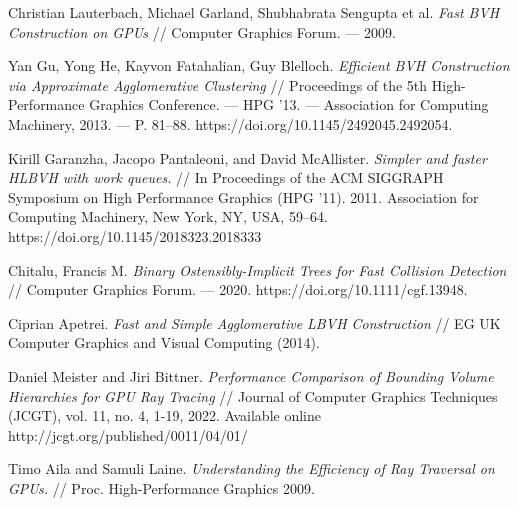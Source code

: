 \documentclass[11pt,fleqn,english,russian]{report} %
\begin{document}
\begin{thebibliography}{10}
	 Christian Lauterbach, Michael Garland, Shubhabrata Sengupta et al. \textit{Fast BVH Construction on GPUs} // Computer Graphics Forum. — 2009.
	
	 Yan Gu, Yong He, Kayvon Fatahalian, Guy Blelloch. \textit{Efficient BVH Construction via Approximate Agglomerative Clustering} // Proceedings of the 5th High-Performance Graphics Conference. — HPG ’13. — Association for Computing Machinery, 2013. — P. 81–88. https://doi.org/10.1145/2492045.2492054.
	
	 Kirill Garanzha, Jacopo Pantaleoni, and David McAllister. \textit{Simpler and faster HLBVH with work queues.} // In Proceedings of the ACM SIGGRAPH Symposium on High Performance Graphics (HPG '11). 2011. Association for Computing Machinery, New York, NY, USA, 59–64. https://doi.org/10.1145/2018323.2018333
	
	 Chitalu, Francis M. \textit{Binary Ostensibly-Implicit Trees for Fast Collision Detection} // Computer Graphics Forum. — 2020. https://doi.org/10.1111/cgf.13948.
	
	 Ciprian Apetrei. \textit{Fast and Simple Agglomerative LBVH Construction} // EG UK Computer Graphics and Visual Computing (2014).
	
	 Daniel Meister and Jiri Bittner. \textit{Performance Comparison of Bounding Volume Hierarchies for GPU Ray Tracing} // Journal of Computer Graphics Techniques (JCGT), vol. 11, no. 4, 1-19, 2022. Available online http://jcgt.org/published/0011/04/01/
	
	 Timo Aila and Samuli Laine. \textit{Understanding the Efficiency of Ray Traversal on GPUs.} // Proc. High-Performance Graphics 2009.
	
	
\end{thebibliography}
\end{document}
